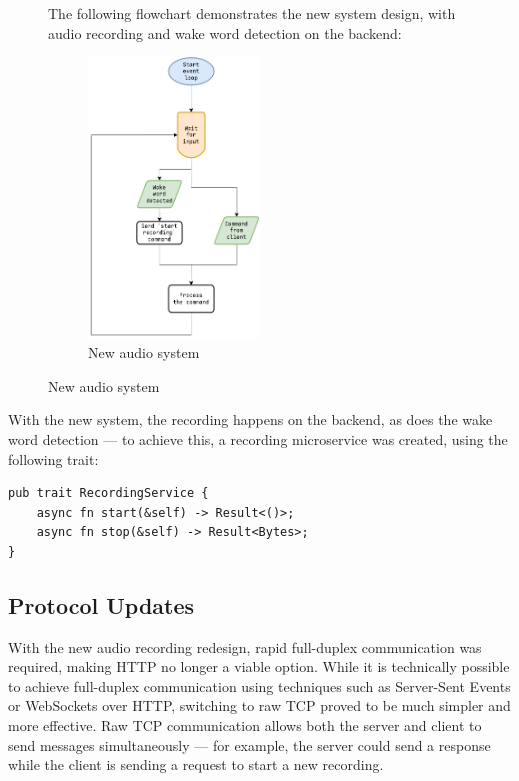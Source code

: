 \begin{figure}[H]
  The following flowchart demonstrates the new system design, with audio recording and wake word detection on the backend:
  \begin{figure}[H]
    \centering
    \includegraphics[width=0.5\textwidth]{assets/audio-new}
    \caption{New audio system}
    \label{chart:audio-new}
  \end{figure}
\end{figure}

With the new system, the recording happens on the backend, as does the wake word detection ---
to achieve this, a recording microservice was created, using the following trait:

\begin{verbatim}
pub trait RecordingService {
    async fn start(&self) -> Result<()>;
    async fn stop(&self) -> Result<Bytes>;
}
\end{verbatim}

\subsection{Protocol Updates}
With the new audio recording redesign, rapid full-duplex communication was required, making HTTP no longer a viable option.
While it is technically possible to achieve full-duplex communication using techniques such as Server-Sent Events or WebSockets over HTTP,
switching to raw TCP proved to be much simpler and more effective.
Raw TCP communication allows both the server and client to send messages simultaneously ---
for example, the server could send a response while the client is sending a request to start a new recording.

